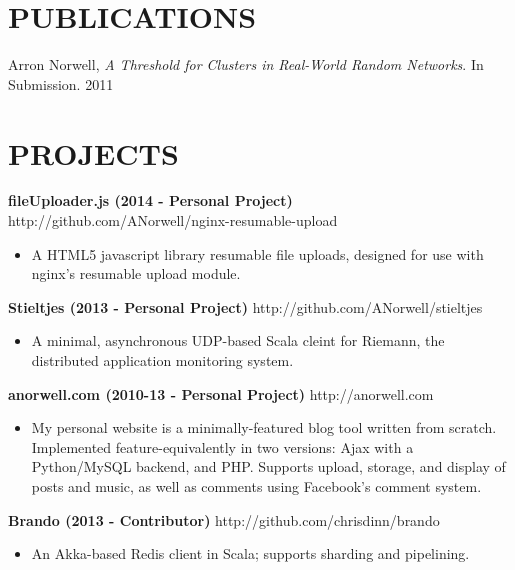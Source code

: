 \documentclass[line,margin]{res}
\begin{document}
\begin{resume}
\section{PUBLICATIONS}

    Arron Norwell, {\sl A Threshold for Clusters in Real-World Random Networks}. In Submission.  \hfill 2011 \\
  

\section{PROJECTS}

{\bf fileUploader.js (2014 - Personal Project)} \hfill http://github.com/ANorwell/nginx-resumable-upload
                 \begin{itemize}  \itemsep -2pt %
                 \item A HTML5 javascript library resumable file uploads, designed for use with nginx's resumable upload module. 
                \end{itemize}
  
{\bf Stieltjes (2013 - Personal Project)} \hfill http://github.com/ANorwell/stieltjes
                 \begin{itemize}  \itemsep -2pt %
                 \item A minimal, asynchronous UDP-based Scala cleint for Riemann, the distributed application monitoring system. 
                \end{itemize}
  
{\bf anorwell.com (2010-13 - Personal Project)} \hfill http://anorwell.com
                 \begin{itemize}  \itemsep -2pt %
                 \item My personal website is a minimally-featured blog tool written from scratch. Implemented feature-equivalently in two versions: Ajax with a Python/MySQL backend, and PHP.  Supports upload, storage, and display of posts and music, as well as comments using Facebook's comment system. 
                \end{itemize}
  
{\bf Brando (2013 - Contributor)} \hfill http://github.com/chrisdinn/brando
                 \begin{itemize}  \itemsep -2pt %
                 \item An Akka-based Redis client in Scala; supports sharding and pipelining.
                \end{itemize}
  

\end{resume}
\end{document}
